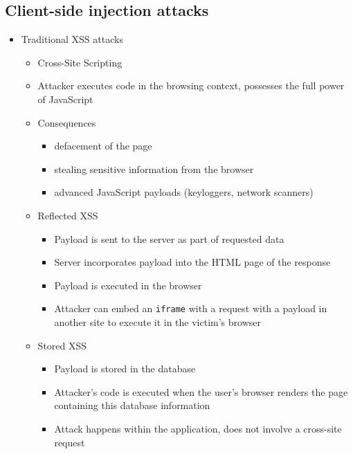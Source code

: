 \documentclass[12pt,titlepage,a4paper]{report}
\begin{document}
	\subsection{Client-side injection attacks}
	\begin{itemize}
		\item Traditional XSS attacks
		\begin{itemize}
			\item Cross-Site Scripting
			\item Attacker executes code in the browsing context, possesses the full power of JavaScript
			\item Consequences
			\begin{itemize}
				\item defacement of the page
				\item stealing sensitive information from the browser
				\item advanced JavaScript payloads (keyloggers, network scanners)
			\end{itemize}
			\item Reflected XSS
			\begin{itemize}
				\item Payload is sent to the server as part of requested data
				\item Server incorporates payload into the HTML page of the response
				\item Payload is executed in the browser
				\item Attacker can embed an \texttt{iframe} with a request with a payload in another site to execute it in the victim's browser
			\end{itemize}
			\item Stored XSS
			\begin{itemize}
				\item Payload is stored in the database
				\item Attacker's code is executed when the user's browser renders the page containing this database information
				\item Attack happens within the application, does not involve a cross-site request
			\end{itemize}
		\end{itemize}
	

\end{itemize}
\end{document}
